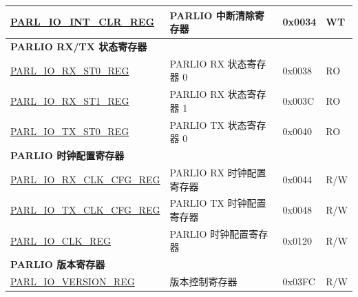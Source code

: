 \begin{longtable}{ | p{6cm} | p{6cm} | p{1.3cm} | p{1.8cm} | }
\hyperref[regdesc:PARLIOINTCLRREG]{PARL\_IO\_INT\_CLR\_REG} & PARLIO 中断清除寄存器 & 0x0034 & WT \\ \hline
\multicolumn{4}{|l|}{\textbf{PARLIO RX/TX 状态寄存器}} \\ \hline
\hyperref[regdesc:PARLIORXST0REG]{PARL\_IO\_RX\_ST0\_REG} & PARLIO RX 状态寄存器 0 & 0x0038 & RO \\ \hline
\hyperref[regdesc:PARLIORXST1REG]{PARL\_IO\_RX\_ST1\_REG} & PARLIO RX 状态寄存器 1 & 0x003C & RO \\ \hline
\hyperref[regdesc:PARLIOTXST0REG]{PARL\_IO\_TX\_ST0\_REG} & PARLIO TX 状态寄存器 0 & 0x0040 & RO \\ \hline
\multicolumn{4}{|l|}{\textbf{PARLIO 时钟配置寄存器}} \\ \hline
\hyperref[regdesc:PARLIORXCLKCFGREG]{PARL\_IO\_RX\_CLK\_CFG\_REG} & PARLIO RX 时钟配置寄存器 & 0x0044 & R/W \\ \hline
\hyperref[regdesc:PARLIOTXCLKCFGREG]{PARL\_IO\_TX\_CLK\_CFG\_REG} & PARLIO TX 时钟配置寄存器 & 0x0048 & R/W \\ \hline
\hyperref[regdesc:PARLIOCLKREG]{PARL\_IO\_CLK\_REG} & PARLIO 时钟配置寄存器 & 0x0120 & R/W \\ \hline
\multicolumn{4}{|l|}{\textbf{PARLIO 版本寄存器}} \\ \hline
\hyperref[regdesc:PARLIOVERSIONREG]{PARL\_IO\_VERSION\_REG} & 版本控制寄存器 & 0x03FC & R/W \\ \hline
\end{longtable}
